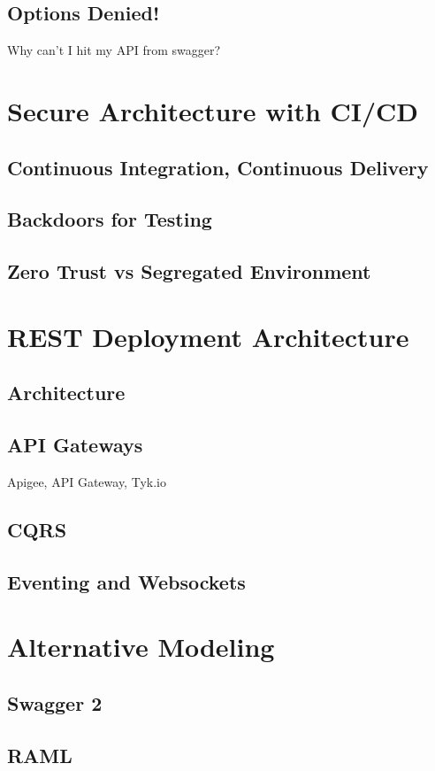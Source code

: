 \documentclass[12pt,oneside]{book} %
\begin{document}
\section{Options Denied!}
Why can't I hit my API from swagger?

\chapter{Secure Architecture with CI/CD}
\section{Continuous Integration, Continuous Delivery}
\section{Backdoors for Testing}
\section{Zero Trust vs Segregated Environment}

\chapter{REST Deployment Architecture}
\section{Architecture}
\section{API Gateways}
Apigee, API Gateway, Tyk.io
\section{CQRS}
\section{Eventing and Websockets}

\chapter{Alternative Modeling}
\section{Swagger 2}
\section{RAML}
\end{document}
